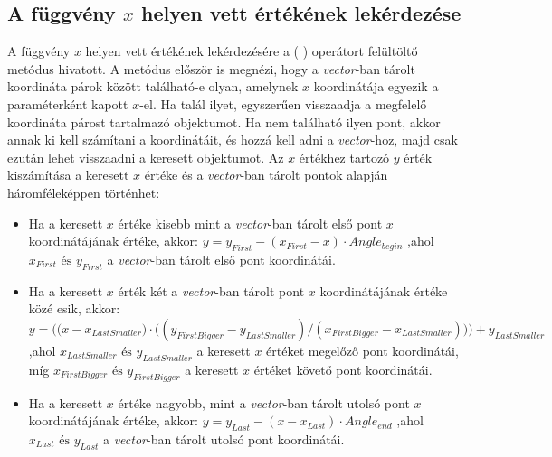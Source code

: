 \subsection{A függvény $x$ helyen vett értékének lekérdezése} \label{getValue}
A függvény $x$ helyen vett értékének lekérdezésére a ( ) operátort felültöltő metódus hivatott.
A metódus először is megnézi, hogy a \textit{vector}-ban tárolt koordináta párok között található-e olyan, amelynek $x$ koordinátája egyezik a paraméterként kapott $x$-el.
Ha talál ilyet, egyszerűen visszaadja a megfelelő koordináta párost tartalmazó  objektumot.
Ha nem található ilyen pont, akkor annak ki kell számítani a koordinátáit, és hozzá kell adni a \textit{vector}-hoz, majd csak ezután lehet visszaadni a keresett  objektumot.
Az $x$ értékhez tartozó $y$ érték kiszámítása a keresett $x$ értéke és a \textit{vector}-ban tárolt pontok alapján háromféleképpen történhet:
\begin{itemize}
\item Ha a keresett $x$ értéke kisebb mint a \textit{vector}-ban tárolt első pont $x$ koordinátájának értéke, akkor: 
$y=y_{First}-(x_{First}-x) \cdot Angle_{begin}$ ,ahol $x_{First} \text{ és } y_{First}$ a \textit{vector}-ban tárolt első pont koordinátái.
\item Ha a keresett $x$ érték két a \textit{vector}-ban tárolt pont $x$ koordinátájának értéke közé esik, akkor:
$y=\bigg(\big(x-x_{LastSmaller}\big) \cdot \big((y_{FirstBigger}-y_{LastSmaller})/(x_{FirstBigger}-x_{LastSmaller})\big)\bigg)+y_{LastSmaller}$ ,ahol $x_{LastSmaller} \text{ és } y_{LastSmaller}$ a keresett $x$ értéket megelőző pont koordinátái, míg $x_{FirstBigger} \text{ és } y_{FirstBigger}$ a keresett $x$ értéket követő pont koordinátái. 
\item Ha a keresett $x$ értéke nagyobb, mint a \textit{vector}-ban tárolt utolsó pont $x$ koordinátájának értéke, akkor:
$y=y_{Last}-(x-x_{Last}) \cdot Angle_{end}$ ,ahol $x_{Last} \text{ és } y_{Last}$ a \textit{vector}-ban tárolt utolsó pont koordinátái.
\end{itemize}
